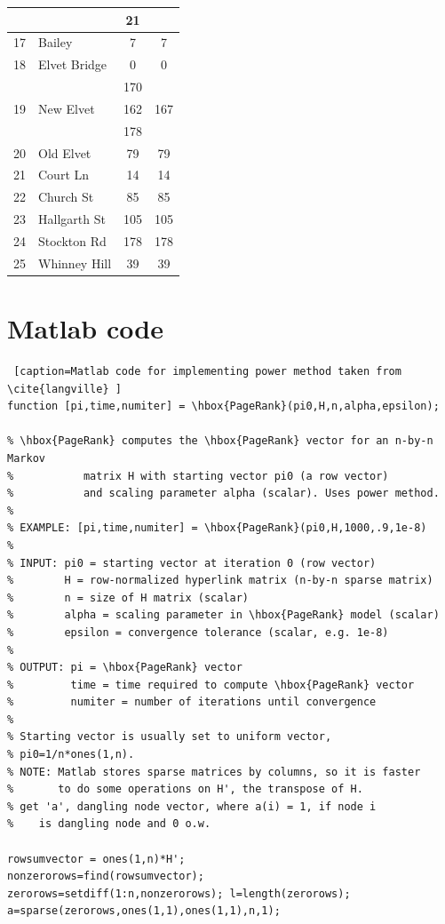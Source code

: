 \documentclass[11pt]{report}
\begin{document}
{\begin{appendices}
\begin{table}[h]
\begin{tabular} {r l| c |c}
 &&21\\
 \hline
 17& Bailey&7&7\\
 \hline
 18 & Elvet Bridge&0&0\\
 \hline
 \multirow{3}{*}{19}&\multirow{3}{*}{New Elvet}&170&\multirow{3}{*}{167}\\
 &&162\\
 &&178\\
 \hline
 20 & Old Elvet&79&79\\
 \hline
 21 & Court Ln&14&14\\
 \hline
 22 & Church St&85&85\\
 \hline
 23 &Hallgarth St&105&105\\
 \hline
 24 & Stockton Rd&178&178\\
 \hline
 25 & Whinney Hill&39&39\\ 
 \end{tabular}
 \label{Table:Durham cars}
\end{table}

\chapter{Matlab code} \label{app:code}

\begin{lstlisting} [caption=Matlab code for implementing power method taken from \cite{langville} ]
function [pi,time,numiter] = \hbox{PageRank}(pi0,H,n,alpha,epsilon);

% \hbox{PageRank} computes the \hbox{PageRank} vector for an n-by-n Markov
%           matrix H with starting vector pi0 (a row vector)
%           and scaling parameter alpha (scalar). Uses power method.
%
% EXAMPLE: [pi,time,numiter] = \hbox{PageRank}(pi0,H,1000,.9,1e-8)
%
% INPUT: pi0 = starting vector at iteration 0 (row vector)
%        H = row-normalized hyperlink matrix (n-by-n sparse matrix)
%        n = size of H matrix (scalar)
%        alpha = scaling parameter in \hbox{PageRank} model (scalar)
%        epsilon = convergence tolerance (scalar, e.g. 1e-8)
%
% OUTPUT: pi = \hbox{PageRank} vector
%         time = time required to compute \hbox{PageRank} vector
%         numiter = number of iterations until convergence
%        
% Starting vector is usually set to uniform vector,
% pi0=1/n*ones(1,n).
% NOTE: Matlab stores sparse matrices by columns, so it is faster
%       to do some operations on H', the transpose of H.
% get 'a', dangling node vector, where a(i) = 1, if node i 
%    is dangling node and 0 o.w.

rowsumvector = ones(1,n)*H';
nonzerorows=find(rowsumvector);
zerorows=setdiff(1:n,nonzerorows); l=length(zerorows);
a=sparse(zerorows,ones(1,1),ones(1,1),n,1);


\end{lstlisting}
\end{appendices}}
\end{document}
